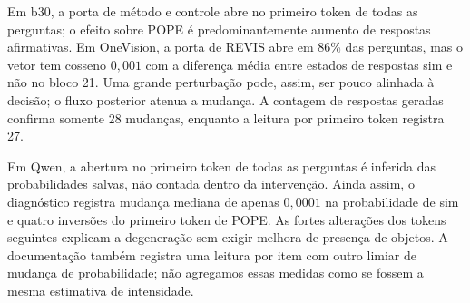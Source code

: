 Em b30, a porta de método e controle abre no primeiro token de todas as perguntas; o efeito sobre POPE é predominantemente aumento de respostas afirmativas. Em OneVision, a porta de REVIS abre em 86\% das perguntas, mas o vetor tem cosseno $0{,}001$ com a diferença média entre estados de respostas sim e não no bloco 21. Uma grande perturbação pode, assim, ser pouco alinhada à decisão; o fluxo posterior atenua a mudança. A contagem de respostas geradas confirma somente 28 mudanças, enquanto a leitura por primeiro token registra 27.

Em Qwen, a abertura no primeiro token de todas as perguntas é inferida das probabilidades salvas, não contada dentro da intervenção. Ainda assim, o diagnóstico registra mudança mediana de apenas $0{,}0001$ na probabilidade de sim e quatro inversões do primeiro token de POPE. As fortes alterações dos tokens seguintes explicam a degeneração sem exigir melhora de presença de objetos. A documentação também registra uma leitura por item com outro limiar de mudança de probabilidade; não agregamos essas medidas como se fossem a mesma estimativa de intensidade.
